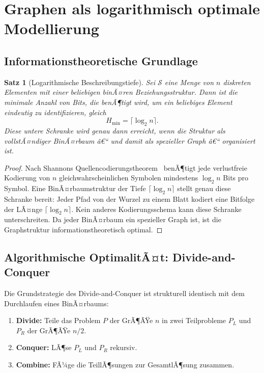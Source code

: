 ﻿\documentclass[12pt,a4paper,twoside]{article}
\theoremstyle{definition}
\theoremstyle{plain}
\newtheorem{theorem}{Satz}[section]
\theoremstyle{remark}
\begin{document}
\section{Graphen als logarithmisch optimale Modellierung}
\label{sec:log_beweis}

\subsection{Informationstheoretische Grundlage}

\begin{theorem}[Logarithmische Beschreibungstiefe]
\label{thm:log}
Sei $\mathcal{S}$ eine Menge von $n$ diskreten Elementen mit
einer beliebigen binÃ¤ren Beziehungsstruktur.  Dann ist die
minimale Anzahl von Bits, die benÃ¶tigt wird, um ein beliebiges
Element eindeutig zu identifizieren, gleich
\[
  H_{\min} = \lceil \log_2 n \rceil.
\]
Diese untere Schranke wird genau dann erreicht, wenn die Struktur
als vollstÃ¤ndiger BinÃ¤rbaum â€“ und damit als spezieller Graph â€“
organisiert ist.
\end{theorem}

\begin{proof}
Nach Shannons Quellencodierungstheorem~\cite{Shannon1948} benÃ¶tigt
jede verlustfreie Kodierung von $n$ gleichwahrscheinlichen Symbolen
mindestens $\log_2 n$ Bits pro Symbol.  Eine BinÃ¤rbaumstruktur
der Tiefe $\lceil \log_2 n \rceil$ stellt genau diese Schranke
bereit: Jeder Pfad von der Wurzel zu einem Blatt kodiert eine
Bitfolge der LÃ¤nge $\lceil \log_2 n \rceil$.  Kein anderes
Kodierungsschema kann diese Schranke unterschreiten.
Da jeder BinÃ¤rbaum ein spezieller Graph ist, ist die
Graphstruktur informationstheoretisch optimal.
\end{proof}

\subsection{Algorithmische OptimalitÃ¤t: Divide-and-Conquer}

Die Grundstrategie des Divide-and-Conquer ist strukturell identisch
mit dem Durchlaufen eines BinÃ¤rbaums:

\begin{enumerate}[label=\textbf{(\arabic*)}]
  \item \textbf{Divide:} Teile das Problem $P$ der GrÃ¶ÃŸe $n$ in
        zwei Teilprobleme $P_L$ und $P_R$ der GrÃ¶ÃŸe $n/2$.
  \item \textbf{Conquer:} LÃ¶se $P_L$ und $P_R$ rekursiv.
  \item \textbf{Combine:} FÃ¼ge die TeillÃ¶sungen zur GesamtlÃ¶sung
        zusammen.
\end{enumerate}
\end{document}

